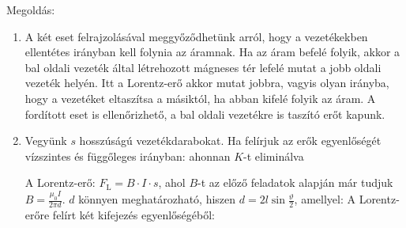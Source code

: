 
\ifdefined\megoldas

 Megoldás: 
 
 
 \begin{enumerate}[label=\alph*),itemsep=0pt]
  \item
   A két eset felrajzolásával meggyőződhetünk arról, hogy a vezetékekben ellentétes irányban kell folynia az áramnak. Ha az áram befelé folyik, akkor a bal oldali vezeték által létrehozott mágneses tér lefelé mutat a jobb oldali vezeték helyén. Itt a Lorentz-erő akkor mutat jobbra, vagyis olyan irányba, hogy a vezetéket eltaszítsa a másiktól, ha abban kifelé folyik az áram. A fordított eset is ellenőrizhető, a bal oldali vezetékre is taszító erőt kapunk.
  \item
   Vegyünk $s$ hosszúságú vezetékdarabokat. Ha felírjuk az erők egyenlőségét vízszintes és függőleges irányban:
   ahonnan $K$-t eliminálva
   
   A Lorentz-erő: $F_\text{L}=B\cdot I\cdot s$, ahol $B$-t az előző feladatok alapján már tudjuk $B=\frac{\mu_0 I}{2\pi d}$. $d$ könnyen meghatározható, hiszen $d=2l\sin\frac{\vartheta}{2}$, amellyel:
   A Lorentz-erőre felírt két kifejezés egyenlőségéből:
 \end{enumerate}

 \fi